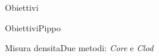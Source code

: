 \documentclass[10pt]{beamer}
\begin{document}
\begin{frame}{Obiettivi}
\begin{frame}{Obiettivi}{Pippo}
\begin{frame}{Misura densita}{Due metodi: \emph{Core} e \emph{Clod}}
\begin{columns}[c]
  \end{columns}

\end{frame}


\end{frame}
\end{frame}
\end{document}
